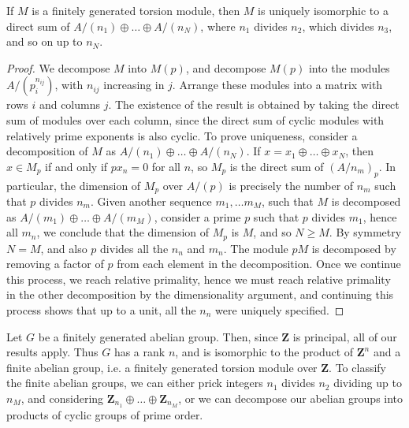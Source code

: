 \begin{lemma}
    If $M$ is a finitely generated torsion module, then $M$ is uniquely isomorphic to a direct sum of $A/(n_1) \oplus \dots \oplus A/(n_N)$, where $n_1$ divides $n_2$, which divides $n_3$, and so on up to $n_N$.
\end{lemma}
\begin{proof}
    We decompose $M$ into $M(p)$, and decompose $M(p)$ into the modules $A/(p_i^{n_{ij}})$, with $n_{ij}$ increasing in $j$. Arrange these modules into a matrix with rows $i$ and columns $j$. The existence of the result is obtained by taking the direct sum of modules over each column, since the direct sum of cyclic modules with relatively prime exponents is also cyclic. To prove uniqueness, consider a decomposition of $M$ as $A/(n_1) \oplus \dots \oplus A/(n_N)$. If $x = x_1 \oplus \dots \oplus x_N$, then $x \in M_p$ if and only if $px_n = 0$ for all $n$, so $M_p$ is the direct sum of $(A/n_m)_p$. In particular, the dimension of $M_p$ over $A/(p)$ is precisely the number of $n_m$ such that $p$ divides $n_m$. Given another sequence $m_1, \dots m_M$, such that $M$ is decomposed as $A/(m_1) \oplus \dots \oplus A/(m_M)$, consider a prime $p$ such that $p$ divides $m_1$, hence all $m_n$, we conclude that the dimension of $M_p$ is $M$, and so $N \geq M$. By symmetry $N = M$, and also $p$ divides all the $n_n$ and $m_n$. The module $pM$ is decomposed by removing a factor of $p$ from each element in the decomposition. Once we continue this process, we reach relative primality, hence we must reach relative primality in the other decomposition by the dimensionality argument, and continuing this process shows that up to a unit, all the $n_n$ were uniquely specified.
\end{proof}

\begin{example}
    Let $G$ be a finitely generated abelian group. Then, since $\mathbf{Z}$ is principal, all of our results apply. Thus $G$ has a rank $n$, and is isomorphic to the product of $\mathbf{Z}^n$ and a finite abelian group, i.e. a finitely generated torsion module over $\mathbf{Z}$. To classify the finite abelian groups, we can either prick integers $n_1$ divides $n_2$ dividing up to $n_M$, and considering $\mathbf{Z}_{n_1} \oplus \dots \oplus \mathbf{Z}_{n_M}$, or we can decompose our abelian groups into products of cyclic groups of prime order.
\end{example}

